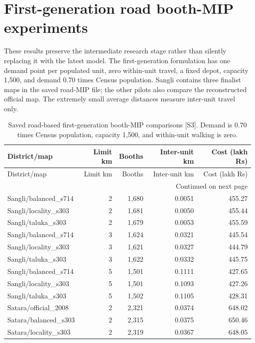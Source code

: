 \documentclass[11pt,a4paper,oneside]{report}
\begin{document}
\chapter{First-generation road booth-MIP experiments}\label{app:legacy}
These results preserve the intermediate research stage rather than silently replacing it with the latest model. The first-generation formulation has one demand point per populated unit, zero within-unit travel, a fixed depot, capacity 1,500, and demand 0.70 times Census population. Sangli contains three finalist maps in the saved road-MIP file; the other pilots also compare the reconstructed official map. The extremely small average distances measure inter-unit travel only.
\begin{center}
\small
\setlength{\tabcolsep}{5pt}
\begin{longtable}{p{6cm}rrrr}
\caption{Saved road-based first-generation booth-MIP comparisons [S3]. Demand is 0.70 times Census population, capacity 1,500, and within-unit walking is zero.}\\
\toprule
District/map & Limit km & Booths & Inter-unit km & Cost (lakh Rs)\\
\midrule\endfirsthead
\toprule
District/map & Limit km & Booths & Inter-unit km & Cost (lakh Rs)\\
\midrule\endhead
\midrule\multicolumn{5}{r}{\footnotesize Continued on next page}\\\endfoot
\bottomrule\endlastfoot
Sangli/balanced\_s714 & 2 & 1,680 & 0.0051 & 455.27\\
Sangli/locality\_s303 & 2 & 1,681 & 0.0050 & 455.44\\
Sangli/taluka\_s303 & 2 & 1,679 & 0.0053 & 455.59\\
Sangli/balanced\_s714 & 3 & 1,624 & 0.0321 & 445.54\\
Sangli/locality\_s303 & 3 & 1,621 & 0.0327 & 444.79\\
Sangli/taluka\_s303 & 3 & 1,622 & 0.0332 & 445.75\\
Sangli/balanced\_s714 & 5 & 1,501 & 0.1111 & 427.65\\
Sangli/locality\_s303 & 5 & 1,501 & 0.1093 & 427.26\\
Sangli/taluka\_s303 & 5 & 1,502 & 0.1105 & 428.31\\
Satara/official\_2008 & 2 & 2,321 & 0.0374 & 648.02\\
Satara/balanced\_s303 & 2 & 2,315 & 0.0375 & 650.46\\
Satara/locality\_s303 & 2 & 2,319 & 0.0367 & 648.05\\

\end{longtable}
\end{center}
\end{document}
